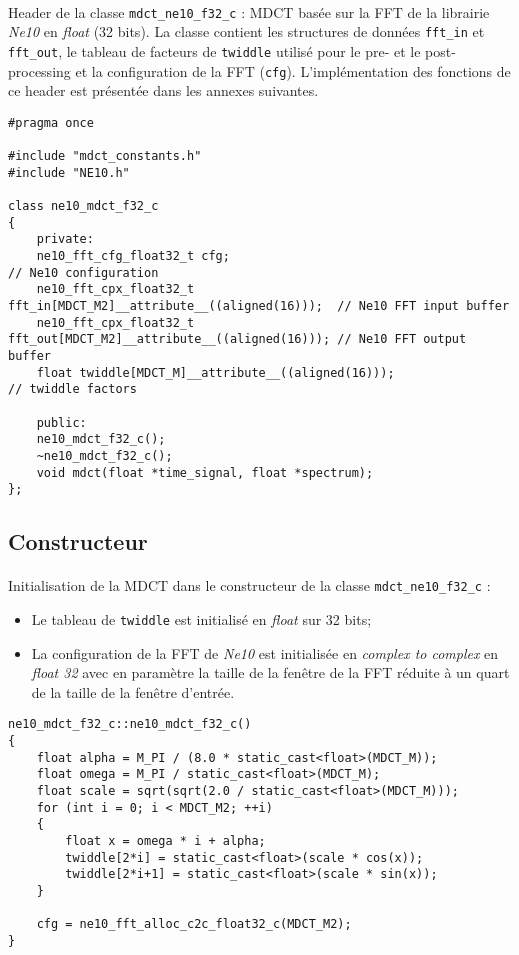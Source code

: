 \documentclass{article}
\begin{document}
\paragraph{}
Header de la classe \texttt{mdct\_ne10\_f32\_c} : MDCT basée sur la FFT de la librairie \emph{Ne10} en \emph{float} (32 bits). La classe contient les structures de données \texttt{fft\_in} et \texttt{fft\_out}, le tableau de facteurs de \texttt{twiddle} utilisé pour le pre- et le post-processing et la configuration de la FFT (\texttt{cfg}). L'implémentation des fonctions de ce header est présentée dans les annexes suivantes.
\lstset{language=C++}
\begin{lstlisting}
#pragma once

#include "mdct_constants.h"
#include "NE10.h"

class ne10_mdct_f32_c
{
    private:
    ne10_fft_cfg_float32_t cfg;                                          // Ne10 configuration
    ne10_fft_cpx_float32_t fft_in[MDCT_M2]__attribute__((aligned(16)));  // Ne10 FFT input buffer
    ne10_fft_cpx_float32_t fft_out[MDCT_M2]__attribute__((aligned(16))); // Ne10 FFT output buffer
    float twiddle[MDCT_M]__attribute__((aligned(16)));                   // twiddle factors

    public:
    ne10_mdct_f32_c();
    ~ne10_mdct_f32_c();
    void mdct(float *time_signal, float *spectrum);
};
\end{lstlisting}

\subsection{Constructeur}\label{app:mdct_ne10_f32_constructor}
\paragraph{}
Initialisation de la MDCT dans le constructeur de la classe \texttt{mdct\_ne10\_f32\_c} :
\begin{itemize}
    \item Le tableau de \texttt{twiddle} est initialisé en \emph{float} sur 32 bits;
    \item La configuration de la FFT de \emph{Ne10} est initialisée en \emph{complex to complex} en \emph{float 32} avec en paramètre la taille de la fenêtre de la FFT réduite à un quart de la taille de la fenêtre d'entrée.
\end{itemize}
\lstset{language=C++}
\begin{lstlisting}
ne10_mdct_f32_c::ne10_mdct_f32_c()
{
    float alpha = M_PI / (8.0 * static_cast<float>(MDCT_M));
    float omega = M_PI / static_cast<float>(MDCT_M);
    float scale = sqrt(sqrt(2.0 / static_cast<float>(MDCT_M)));
    for (int i = 0; i < MDCT_M2; ++i) 
    {
        float x = omega * i + alpha;
        twiddle[2*i] = static_cast<float>(scale * cos(x));
        twiddle[2*i+1] = static_cast<float>(scale * sin(x));
    }

    cfg = ne10_fft_alloc_c2c_float32_c(MDCT_M2);
}
\end{lstlisting}
\end{document}
